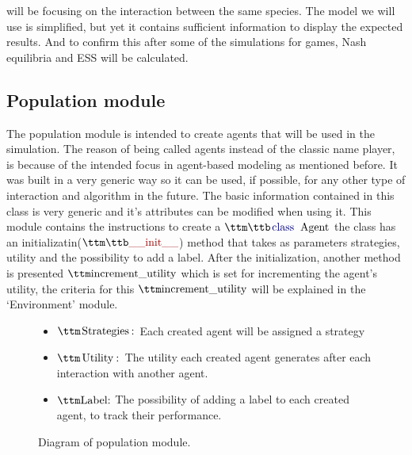 will be focusing on the interaction between the same species. The model we will use is simplified, but yet it contains sufficient information to display the expected results. And to confirm this after some of the simulations for games, Nash equilibria and ESS will be calculated.

\subsection{Population module}
The population module is intended to create agents that will be used in the simulation. The reason of being called agents instead of the classic name player, is because of the intended focus in agent-based modeling as mentioned before. It was built in a very generic way so it can be used, if possible, for any other type of interaction and algorithm in the future. The basic information contained in this class is very generic and it's attributes can be modified when using it. 
This module contains the instructions to create a $\pythoninline{class Agent}$ the class has an initializatin($\pythoninline{__init__}$) method that takes as parameters strategies, utility and the possibility to add a label. After the initialization, another method is presented $\pythoninline{increment\_utility}$ which is set for incrementing the agent’s utility, the criteria for this $\pythoninline{increment\_utility}$ will be explained in the `Environment' module.

\begin{figure}[H]
\begin{center}
\begin{itemize}
	\item $\pythoninline{Strategies:}$ Each created agent will be assigned a strategy
	\item $\pythoninline{Utility:}$ The utility each created agent generates after each interaction with another agent.
	\item $\pythoninline{Label:}$ The possibility of adding a label to each created agent, to track their performance.
\end{itemize}
\caption{ Diagram of population module.}
\label{fig:diagage}
\end{center}
\end{figure}

